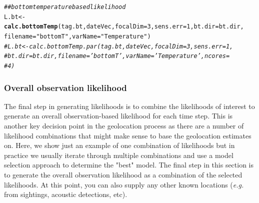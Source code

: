 \documentclass{article}\usepackage[]{graphicx}\usepackage[]{color}
\makeatletter
\newcommand{\hlnum}[1]{\textcolor[rgb]{0.686,0.059,0.569}{#1}}%
\newcommand{\hlstr}[1]{\textcolor[rgb]{0.192,0.494,0.8}{#1}}%
\newcommand{\hlcom}[1]{\textcolor[rgb]{0.678,0.584,0.686}{\textit{#1}}}%
\newcommand{\hlstd}[1]{\textcolor[rgb]{0.345,0.345,0.345}{#1}}%
\newcommand{\hlkwb}[1]{\textcolor[rgb]{0.69,0.353,0.396}{#1}}%
\newcommand{\hlkwc}[1]{\textcolor[rgb]{0.333,0.667,0.333}{#1}}%
\newcommand{\hlkwd}[1]{\textcolor[rgb]{0.737,0.353,0.396}{\textbf{#1}}}%
\newenvironment{kframe}{%
 \def\at@end@of@kframe{}%
 \ifinner\ifhmode%
  \def\at@end@of@kframe{\end{minipage}}%
  \begin{minipage}{\columnwidth}%
 \fi\fi%
 \def\FrameCommand##1{\hskip\@totalleftmargin \hskip-\fboxsep
 \colorbox{shadecolor}{##1}\hskip-\fboxsep
     \hskip-\linewidth \hskip-\@totalleftmargin \hskip\columnwidth}%
 \MakeFramed {\advance\hsize-\width
   \@totalleftmargin\z@ \linewidth\hsize
   \@setminipage}}%
 {\par\unskip\endMakeFramed%
 \at@end@of@kframe}
\newenvironment{knitrout}{}{} %
\newcommand{\eg}{\textit{e.g.} }
\makeatother
\begin{document}
\begin{knitrout}\small
{}\color{fgcolor}\begin{kframe}
\begin{alltt}
\hlcom{## bottom temperature based likelihood}
\hlstd{L.bt} \hlkwb{<-} \hlkwd{calc.bottomTemp}\hlstd{(tag.bt, dateVec,} \hlkwc{focalDim} \hlstd{=} \hlnum{3}\hlstd{,} \hlkwc{sens.err} \hlstd{=} \hlnum{1}\hlstd{,} \hlkwc{bt.dir} \hlstd{= bt.dir,}
    \hlkwc{filename} \hlstd{=} \hlstr{"bottomT"}\hlstd{,} \hlkwc{varName} \hlstd{=} \hlstr{"Temperature"}\hlstd{)}
\hlcom{# L.bt <- calc.bottomTemp.par(tag.bt, dateVec, focalDim = 3, sens.err = 1,}
\hlcom{# bt.dir = bt.dir, filename = 'bottomT', varName = 'Temperature', ncores =}
\hlcom{# 4)}
\end{alltt}
\end{kframe}
\end{knitrout}


\subsubsection{Overall observation likelihood}

The final step in generating likelihoods is to combine the likelihoods of interest to generate an overall observation-based likelihood for each time step. This is another key decision point in the geolocation process as there are a number of likelihood combinations that might make sense to base the geolocation estimates on. Here, we show just an example of one combination of likelihoods but in practice we usually iterate through multiple combinations and use a model selection approach to determine the "best" model. The final step in this section is to generate the overall observation likelihood as a combination of the selected likelihoods. At this point, you can also supply any other known locations (\eg from sightings, acoustic detections, etc).
\end{document}
